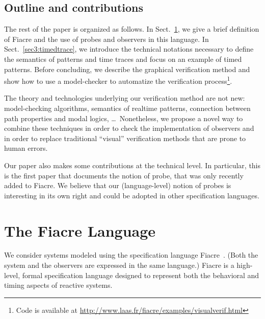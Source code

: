 \documentclass[a4paper]{scrartcl}
\begin{document}
\subsection{Outline and contributions} The rest of the paper is
organized as follows. In Sect.~\ref{sec2:fiacre}, we give a brief
definition of Fiacre and the use of probes and observers in this
language. In Sect.~\ref{sec3:timedtrace}, we introduce the technical
notations necessary to define the semantics of patterns and time
traces and focus on an example of timed patterns. Before concluding,
we describe the graphical verification method and show how to use a
model-checker to automatize the verification process\footnote{Code is
  available at
  \url{http://www.laas.fr/fiacre/examples/visualverif.html}}.

The theory and technologies underlying our verification method are not
new: model-checking algorithms, semantics of realtime patterns,
connection between path properties and modal logics, \dots\
Nonetheless, we propose a novel way to combine these techniques in
order to check the implementation of observers and in order to replace
traditional ``visual'' verification methods that are prone to human
errors. 

Our paper also makes some contributions at the technical level. In
particular, this is the first paper that documents the notion of
probe, that was only recently added to Fiacre. We believe that our
(language-level) notion of probes is interesting in its own right and
could be adopted in other specification languages.

\section{The Fiacre Language}
\label{sec2:fiacre}

We consider systems modeled using the specification language
Fiacre~\cite{Fiacre07,filfmvte2008}. (Both the system and the
observers are expressed in the same language.)  Fiacre is a
high-level, formal specification language designed to represent both
the behavioral and timing aspects of reactive systems.
\end{document}
